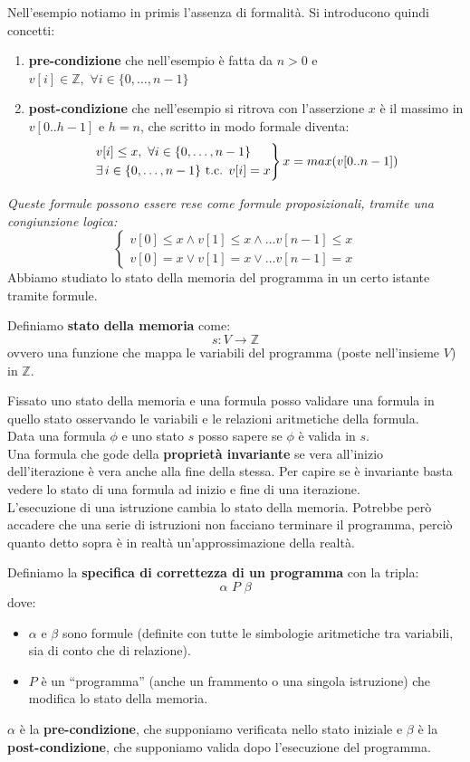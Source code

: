 Nell'esempio notiamo in primis l'assenza di formalità. Si introducono quindi
concetti:
\begin{enumerate}
	\item \textbf{pre-condizione} che nell'esempio è fatta da $n>0$ e
	      $v[i]\in\mathbb{Z},\,\,\forall i\in \{0,\ldots, n-1\}$
	\item \textbf{post-condizione} che nell'esempio si ritrova con l'asserzione $x$
	      è il massimo in $v[0..h-1]$ e $h=n$, che scritto in modo formale diventa:
	      \[
	      	\begin{rcases}
	      		v[i]\leq x,\,\,\forall i\in \{0,\ldots, n-1\}\\
	      		\exists\, i\in\{0,\ldots, n-1\}\mbox{ t.c. } v[i]=x
	      	\end{rcases}
	      	x=max(v[0..n-1])
	      \]
\end{enumerate}
\textit{Queste formule possono essere rese come formule proposizionali, tramite
una congiunzione logica:}
\[
	\begin{cases}
		v[0]\leq x \land v[1]\leq x\land\ldots v[n-1]\leq x \\
		v[0]= x \lor v[1]= x\lor\ldots v[n-1]=x             
	\end{cases}
\]
Abbiamo studiato lo stato della memoria del programma in un certo istante
tramite formule.
\begin{definizione}
	Definiamo \textbf{stato della memoria} come:
	\[s:V\to\mathbb{Z}\]
	ovvero una funzione che mappa le variabili del programma (poste nell'insieme
	$V$) in $\mathbb{Z}$.
\end{definizione}
Fissato uno stato della memoria e una formula posso validare una formula in
quello stato osservando le variabili e le relazioni aritmetiche della
formula.\\
Data una formula $\phi$ e uno stato $s$ posso sapere se $\phi$ è valida in
$s$.\\
Una formula che gode della \textbf{proprietà invariante} se vera all'inizio
dell'iterazione è vera anche alla fine della stessa. Per capire se è invariante
basta vedere lo stato di una formula ad inizio e fine di una iterazione.\\
L'esecuzione di una istruzione cambia lo stato della memoria. Potrebbe però
accadere che una serie di istruzioni non facciano terminare il programma, perciò
quanto detto sopra è in realtà un'approssimazione della realtà.
\begin{definizione}
	Definiamo la \textbf{specifica di correttezza di un programma} con la tripla:
	\[\alpha\,\, P\,\, \beta\]
	dove:
	\begin{itemize}
		\item $\alpha$ e $\beta$ sono formule (definite con tutte le simbologie
		      aritmetiche tra variabili, sia di conto che di relazione).
		\item $P$ è un ``programma'' (anche un frammento o una singola istruzione) che
		      modifica lo stato della memoria.
	\end{itemize}
	$\alpha$ è la \textbf{pre-condizione}, che supponiamo verificata nello stato
	iniziale e $\beta$ è la \textbf{post-condizione}, 
	che supponiamo valida dopo l'esecuzione del programma.
\end{definizione}

